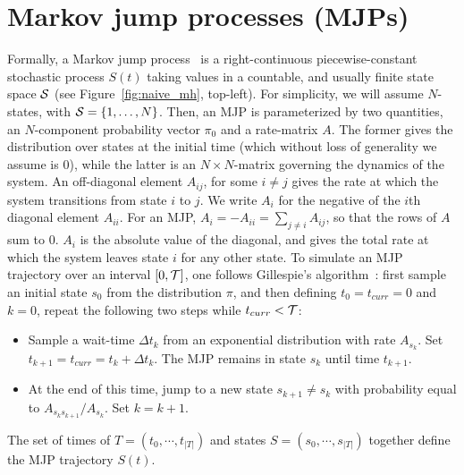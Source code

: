 \section{Markov jump processes (MJPs)} 
Formally, a Markov jump process~\cite{Cinlar1975} is a right-continuous 
piecewise-constant stochastic process $S(t)$ taking values in a countable, and 
usually finite state space ${\mathcal S}$ (see Figure~\ref{fig:naive_mh}, top-left).
For simplicity, we will assume $N$-states, with ${\mathcal S} = \{1,\ldots,N\}$. Then, 
an MJP is parameterized by two quantities, an $N$-component probability vector 
$\pi_0$ and a rate-matrix $A$. The former gives the distribution over states at 
the initial time (which without loss of generality we assume is $0$), while 
the latter is an $N \times N$-matrix governing the dynamics of the system.  An 
off-diagonal element $A_{ij}$, for some $i \neq j$ gives the rate at 
which the system transitions from state $i$ to $j$. We write $A_i$ for the 
negative of the $i$th diagonal element $A_{ii}$. For an MJP,
$A_i = -A_{ii} = \sum_{j \neq i} A_{ij}$, so that the rows of $A$ sum to $0$.  
$A_i$ is the absolute value of the diagonal,
and gives the total rate at which the system leaves state $i$ for any other state.
To simulate an MJP trajectory over an interval $[0,{\mathcal T}]$, one follows 
Gillespie's algorithm~\cite{gillespie97}: 
first sample an initial state $s_0$ from the distribution $\pi$, and
then defining $t_0 = t_{curr} = 0$ and $k = 0$, repeat the following two steps while
$t_{curr} < {\mathcal T}$:
\begin{itemize}
  \item Sample a wait-time $\Delta t_k$ from an exponential distribution with rate 
    $A_{s_k}$.  Set $t_{k+1} = t_{curr} = t_{k} + \Delta t_k$.
    The MJP remains in state $s_k$ until time $t_{k+1}$.
  \item At the end of this time, jump to a new state $s_{k+1} \neq s_k$ with 
    probability equal to $A_{s_ks_{k+1}}/A_{s_k}$. Set $k=k+1$.
\end{itemize}
The set of times of $T=(t_0, \cdots, t_{|T| })$ and states 
$S=(s_0, \cdots, s_{|T| })$ together define the MJP trajectory $S(t)$.

